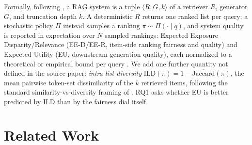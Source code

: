 \documentclass[10pt,twocolumn]{article}
\begin{document}
Formally, following \cite{eunkim2025fairrag}, a RAG system is a tuple
$\langle R, G, k \rangle$ of a retriever $R$, generator $G$, and truncation depth
$k$. A deterministic $R$ returns one ranked list per query; a stochastic policy $\Pi$
instead samples a ranking $\pi \sim \Pi(\cdot \mid q)$, and system quality is reported
in expectation over $N$ sampled rankings: Expected Exposure Disparity/Relevance
(EE-D/EE-R, item-side ranking fairness and quality) and Expected Utility (EU,
downstream generation quality), each normalized to a theoretical or empirical bound
per query \cite{diaz2020evaluating,eunkim2025fairrag}. We add one further quantity
not defined in the source paper: \emph{intra-list diversity}
$\mathrm{ILD}(\pi) = 1 - \overline{\mathrm{Jaccard}}(\pi)$, the mean pairwise
token-set dissimilarity of the $k$ retrieved items, following the standard
similarity-vs-diversity framing of \cite{smyth2001similarity}. RQ1 asks whether EU is
better predicted by ILD than by the fairness dial itself.

\section{Related Work}
\label{sec:related}
\end{document}
